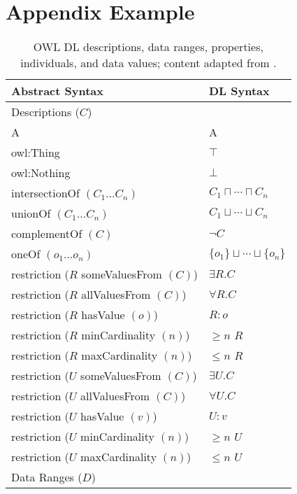 
\chapter{Appendix Example}
\label{chap:AppendixA}

\begin{table}[h]
\centering
\renewcommand{\arraystretch}{1}
\caption{OWL DL descriptions, data ranges, properties, individuals, and data values; content adapted from \cite{Baader2003}.}
\begin{tabular}{|p{10cm}|p{5cm}|}
	\multicolumn{1}{l}{\textbf{Abstract Syntax}}
	& \multicolumn{1}{l}{\textbf{DL Syntax}}\\
			\hline 
			Descriptions ($C$) & {}\\
			\hline
			A & A\\
			owl:Thing & $\top$\\
			owl:Nothing & $\bot$\\
		 \hline
			intersectionOf $(C_{1}\ldots C_{n})$ & $C_{1}\sqcap \cdots \sqcap C_{n}$ \\
			unionOf $(C_{1}\ldots C_{n})$ & $C_{1}\sqcup \cdots \sqcup C_{n}$ \\
			complementOf $(C)$ & $\neg C$\\
			oneOf $(o_{1} \ldots o_{n})$ & $\{o_{1}\} \sqcup \cdots \sqcup \{o_{n}\}$\\
			\hline
			restriction ($R$ someValuesFrom $(C)$) & $\exists R.C$ \\
			restriction ($R$ allValuesFrom $(C)$) & $\forall R.C$ \\
			restriction ($R$ hasValue $(o)$) & $R:o$ \\
			restriction ($R$ minCardinality $(n)$) & $\ge n$ $R$ \\
			restriction ($R$ maxCardinality $(n)$) & $\le n$ $R$ \\
			\hline
			restriction ($U$ someValuesFrom $(C)$) & $\exists U.C$ \\
			restriction ($U$ allValuesFrom $(C)$) & $\forall U.C$ \\
			restriction ($U$ hasValue $(v)$) & $U:v$ \\
			restriction ($U$ minCardinality $(n)$) & $\ge n$ $U$ \\
			restriction ($U$ maxCardinality $(n)$) & $\le n$ $U$ \\
			\hline
			\hline
			Data Ranges ($D$) & {}\\

\end{tabular}
\end{table}
